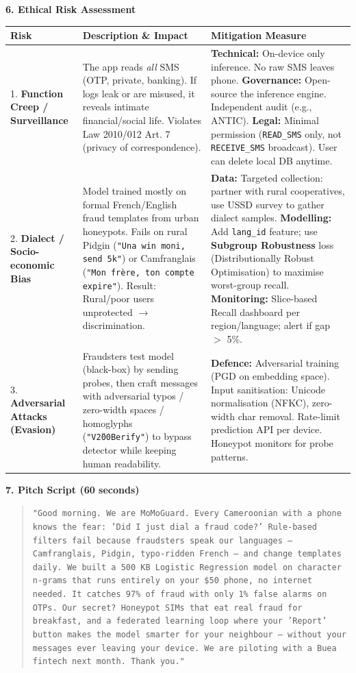 \documentclass[11pt]{article}
\begin{document}
\begin{exemplebox}
\textbf{6. Ethical Risk Assessment}
\begin{center}
\begin{tabularx}{\linewidth}{|l|X|X|}
\hline
\rowcolor{popblueL}
\textbf{Risk} & \textbf{Description \& Impact} & \textbf{Mitigation Measure} \\
\hline
1. \textbf{Function Creep / Surveillance} & The app reads \emph{all} SMS (OTP, private, banking). If logs leak or are misused, it reveals intimate financial/social life. Violates Law 2010/012 Art. 7 (privacy of correspondence). & \textbf{Technical:} On-device only inference. No raw SMS leaves phone. \textbf{Governance:} Open-source the inference engine. Independent audit (e.g., ANTIC). \textbf{Legal:} Minimal permission (\texttt{READ\_SMS} only, not \texttt{RECEIVE\_SMS} broadcast). User can delete local DB anytime. \\
\hline
2. \textbf{Dialect / Socio-economic Bias} & Model trained mostly on formal French/English fraud templates from urban honeypots. Fails on rural Pidgin (\texttt{"Una win moni, send 5k"}) or Camfranglais (\texttt{"Mon fr\`ere, ton compte expire"}). Result: Rural/poor users unprotected $\rightarrow$ discrimination. & \textbf{Data:} Targeted collection: partner with rural cooperatives, use USSD survey to gather dialect samples. \textbf{Modelling:} Add \texttt{lang\_id} feature; use \textbf{Subgroup Robustness} loss (Distributionally Robust Optimisation) to maximise worst-group recall. \textbf{Monitoring:} Slice-based Recall dashboard per region/language; alert if gap $>$ 5\%. \\
\hline
3. \textbf{Adversarial Attacks (Evasion)} & Fraudsters test model (black-box) by sending probes, then craft messages with adversarial typos / zero-width spaces / homoglyphs (\texttt{"V\u200Berify"}) to bypass detector while keeping human readability. & \textbf{Defence:} Adversarial training (PGD on embedding space). Input sanitisation: Unicode normalisation (NFKC), zero-width char removal. Rate-limit prediction API per device. Honeypot monitors for probe patterns. \\
\hline
\end{tabularx}
\end{center}

\textbf{7. Pitch Script (60 seconds)}
\begin{quote}
\texttt{"Good morning. We are MoMoGuard. Every Cameroonian with a phone knows the fear: 'Did I just dial a fraud code?' Rule-based filters fail because fraudsters speak our languages — Camfranglais, Pidgin, typo-ridden French — and change templates daily. We built a 500 KB Logistic Regression model on character n-grams that runs entirely on your \$50 phone, no internet needed. It catches 97\% of fraud with only 1\% false alarms on OTPs. Our secret? Honeypot SIMs that eat real fraud for breakfast, and a federated learning loop where your 'Report' button makes the model smarter for your neighbour — without your messages ever leaving your device. We are piloting with a Buea fintech next month. Thank you."}
\end{quote}
\end{exemplebox}
\end{document}
